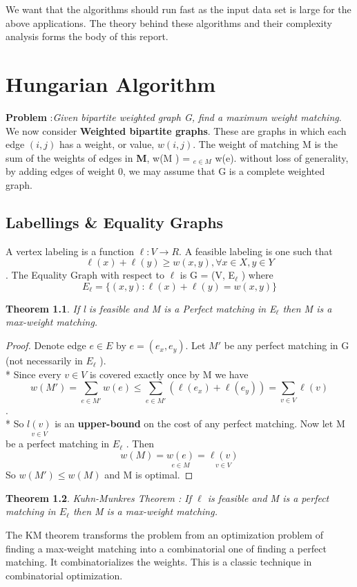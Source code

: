 \documentclass[a4paper]{report}
\newtheorem{theorem}{Theorem}[section]
\theoremstyle{definition}
\begin{document}
We want that the algorithms should run fast as the input data set is large for the above applications. The theory behind these algorithms and their complexity analysis forms the body of this report. 




\chapter{Hungarian Algorithm}
\textbf{Problem} :\textit{Given bipartite weighted graph G, find a maximum weight matching}.\\[1\baselineskip]
We now consider \textbf{Weighted bipartite graphs}. These
are graphs in which each edge $(i, j)$ has a weight, or
value, $w(i, j)$. The weight of matching M is the sum
of the weights of edges in \textbf{M}, w(M ) = $_{e \in M}$ w(e).
without loss of generality, by adding edges of weight
0, we may assume that G is a complete weighted graph.

\section{Labellings \& Equality Graphs}

A vertex labeling is a function $\ell : V \rightarrow R.$ \newline
A feasible labeling is one such that $$\ell(x) + \ell(y) \geq w(x, y),\forall x \in X, y \in Y$$.
The Equality Graph with respect to $\ell$ is G = (V, E$_\ell$ ) where
$$E_\ell = \{(x, y) : \ell(x) + \ell(y) = w(x, y ) \}$$ 
\begin{theorem}\label{my theorem}
If l is feasible and M is a Perfect matching
in E$_\ell$ then M is a max-weight matching.
\end{theorem}
\begin{proof}
Denote edge $e \in E$ by $e = (e_x , e_y )$.
Let $M'$ be any perfect matching in G (not necessarily in $E _\ell$ ).\\*
Since every $v \in V$ is covered exactly once by M we
have $$w(M') = \sum _{e \in M'}w(e) \leq \sum _{e \in M'} (\ell(e_x ) + \ell(e_y )) = \sum _{v\in V} \ell(v)$$.\\*
So $\underset{v\in V}{ l(v)}$ is an \textbf{upper-bound} on the cost of any perfect matching.
Now let M be a perfect matching in $E_\ell$ . Then
$$w(M) = \underset{e\in M}{ w(e)} = \underset{v\in V} {\ell(v)}$$
So $w(M')\leq w(M)$ and M is optimal.
\end{proof} 
\begin{theorem}{Kuhn-Munkres Theorem} : If $\ell$ is feasible and M is a
perfect matching in $E_\ell$ then M is a max-weight matching.
\end{theorem}
The KM theorem transforms the problem from an optimization problem of finding a max-weight matching into a combinatorial one of finding a perfect matching. It combinatorializes the weights. This is a classic technique in combinatorial optimization.
\end{document}
